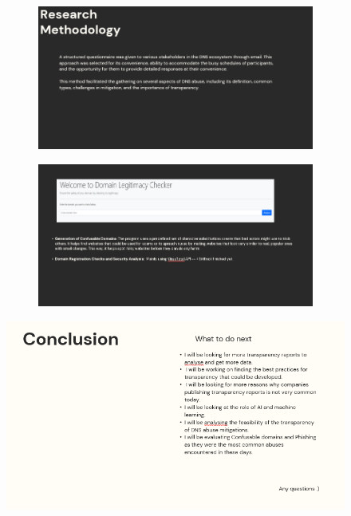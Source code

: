 \begin{figure}[H]
  \centering
  \begin{subfigure}[b]{0.55\textwidth}
    \includegraphics[width=\textwidth]{appendix/pre9.png}
    \label{fig:left}
  \end{subfigure}
  \hfill %
  \begin{subfigure}[b]{0.55\textwidth}
    \includegraphics[width=\textwidth]{appendix/pre10.png}
    \label{fig:right}
  \end{subfigure}
  \label{fig:images}
\end{figure}

\begin{figure}[h]
    \centering
    \includegraphics[width=0.55\linewidth]{appendix/pre11.png}
    \label{fig:lol}
\end{figure}